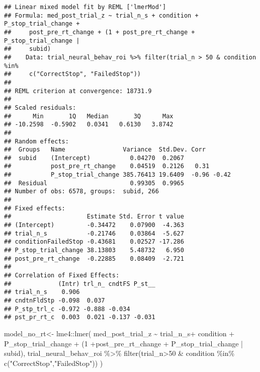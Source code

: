 \documentclass[
]{article}
\newenvironment{Shaded}{\begin{snugshade}}{\end{snugshade}}
\newcommand{\DecValTok}[1]{\textcolor[rgb]{0.00,0.00,0.81}{#1}}
\newcommand{\FunctionTok}[1]{\textcolor[rgb]{0.00,0.00,0.00}{#1}}
\newcommand{\NormalTok}[1]{#1}
\newcommand{\OtherTok}[1]{\textcolor[rgb]{0.56,0.35,0.01}{#1}}
\newcommand{\SpecialCharTok}[1]{\textcolor[rgb]{0.00,0.00,0.00}{#1}}
\newcommand{\StringTok}[1]{\textcolor[rgb]{0.31,0.60,0.02}{#1}}
\begin{document}
\begin{verbatim}
## Linear mixed model fit by REML ['lmerMod']
## Formula: med_post_trial_z ~ trial_n_s + condition + P_stop_trial_change +  
##     post_pre_rt_change + (1 + post_pre_rt_change + P_stop_trial_change |  
##     subid)
##    Data: trial_neural_behav_roi %>% filter(trial_n > 50 & condition %in%  
##     c("CorrectStop", "FailedStop"))
## 
## REML criterion at convergence: 18731.9
## 
## Scaled residuals: 
##      Min       1Q   Median       3Q      Max 
## -10.2598  -0.5902   0.0341   0.6130   3.8742 
## 
## Random effects:
##  Groups   Name                Variance  Std.Dev. Corr       
##  subid    (Intercept)           0.04270  0.2067             
##           post_pre_rt_change    0.04519  0.2126   0.31      
##           P_stop_trial_change 385.76413 19.6409  -0.96 -0.42
##  Residual                       0.99305  0.9965             
## Number of obs: 6578, groups:  subid, 266
## 
## Fixed effects:
##                     Estimate Std. Error t value
## (Intercept)         -0.34472    0.07900  -4.363
## trial_n_s           -0.21746    0.03864  -5.627
## conditionFailedStop -0.43681    0.02527 -17.286
## P_stop_trial_change 38.13803    5.48732   6.950
## post_pre_rt_change  -0.22885    0.08409  -2.721
## 
## Correlation of Fixed Effects:
##             (Intr) trl_n_ cndtFS P_st__
## trial_n_s    0.906                     
## cndtnFldStp -0.098  0.037              
## P_stp_trl_c -0.972 -0.888 -0.034       
## pst_pr_rt_c  0.003  0.021 -0.137 -0.031
\end{verbatim}

\begin{Shaded}
\begin{Highlighting}[]
\NormalTok{model\_no\_rt}\OtherTok{\textless{}{-}}\NormalTok{ lme4}\SpecialCharTok{::}\FunctionTok{lmer}\NormalTok{(}
\NormalTok{   med\_post\_trial\_z }\SpecialCharTok{\textasciitilde{}}\NormalTok{ trial\_n\_s}\SpecialCharTok{+}\NormalTok{ condition }\SpecialCharTok{+}\NormalTok{ P\_stop\_trial\_change }\SpecialCharTok{+}\NormalTok{ (}\DecValTok{1} \SpecialCharTok{+}\NormalTok{post\_pre\_rt\_change  }\SpecialCharTok{+}\NormalTok{ P\_stop\_trial\_change  }\SpecialCharTok{|}\NormalTok{ subid),}
\NormalTok{  trial\_neural\_behav\_roi }\SpecialCharTok{\%\textgreater{}\%} \FunctionTok{filter}\NormalTok{(trial\_n}\SpecialCharTok{\textgreater{}}\DecValTok{50} \SpecialCharTok{\&}\NormalTok{ condition }\SpecialCharTok{\%in\%} \FunctionTok{c}\NormalTok{(}\StringTok{"CorrectStop"}\NormalTok{,}\StringTok{"FailedStop"}\NormalTok{))}
\NormalTok{  )}
\end{Highlighting}
\end{Shaded}
\end{document}
